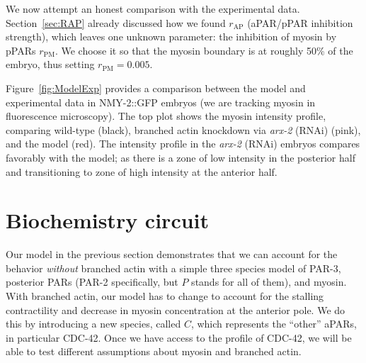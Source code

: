 \documentclass[11pt]{article}
\newcommand{\6}[1]{#1_{\text{6}}}
\newcommand{\3}[1]{#1_{\text{3}}}
\begin{document}
We now attempt an honest comparison with the experimental data. Section\ \ref{sec:RAP} already discussed how we found $r_\text{AP}$ (aPAR/pPAR inhibition strength), which leaves one unknown parameter: the inhibition of myosin by pPARs $r_\text{PM}$. We choose it so that the myosin boundary is at roughly 50\% of the embryo, thus setting $r_\text{PM}=0.005$. 

Figure\ \ref{fig:ModelExp} provides a comparison between the model and experimental data in NMY-2::GFP embryos (we are tracking myosin in fluorescence microscopy). The top plot shows the myosin intensity profile, comparing wild-type (black), branched actin knockdown via \emph{arx-2} (RNAi) (pink), and the model (red). The intensity profile in the \emph{arx-2} (RNAi) embryos compares favorably with the model; as there is a zone of low intensity in the posterior half and transitioning to zone of high intensity at the anterior half.

\fi 

\section{Biochemistry circuit}
Our model in the previous section demonstrates that we can account for the behavior \emph{without} branched actin with a simple three species model of PAR-3, posterior PARs (PAR-2 specifically, but $P$ stands for all of them), and myosin. With branched actin, our model has to change to account for the stalling contractility and decrease in myosin concentration at the anterior pole. We do this by introducing a new species, called $C$, which represents the ``other'' aPARs, in particular CDC-42. Once we have access to the profile of CDC-42, we will be able to test different assumptions about myosin and branched actin. 
\end{document}
